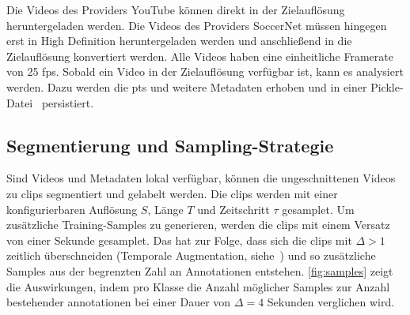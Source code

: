 Die Videos des Providers YouTube können direkt in der Zielauflösung heruntergeladen werden.
Die Videos des Providers SoccerNet müssen hingegen erst in High Definition heruntergeladen werden und anschließend in die Zielauflösung konvertiert werden.
Alle Videos haben eine einheitliche Framerate von 25 \gls{fps}.
Sobald ein Video in der Zielauflösung verfügbar ist, kann es analysiert werden.
Dazu werden die \gls{pts} und weitere Metadaten erhoben und in einer Pickle-Datei~\cite{Lubanovic19} persistiert.

\subsection{Segmentierung und Sampling-Strategie}
\label{subsec:segmentierung-und-sampling-strategie}

Sind Videos und Metadaten lokal verfügbar, können die ungeschnittenen Videos zu \glspl{clip} segmentiert und gelabelt werden.
Die \glspl{clip} werden mit einer konfigurierbaren Auflösung $S$, Länge $T$ und Zeitschritt $\tau$ gesamplet.
Um zusätzliche Training-Samples zu generieren, werden die \glspl{clip} mit einem Versatz von einer Sekunde gesamplet.
Das hat zur Folge, dass sich die \glspl{clip} mit $\Delta > 1$ zeitlich überschneiden (Temporale Augmentation, siehe~\cite{Giancola18}) und so zusätzliche Samples aus der begrenzten Zahl an Annotationen entstehen.
\autoref{fig:samples} zeigt die Auswirkungen, indem pro Klasse die Anzahl möglicher Samples zur Anzahl bestehender \gls{annotationen} bei einer Dauer von $\Delta=4$ Sekunden verglichen wird.

